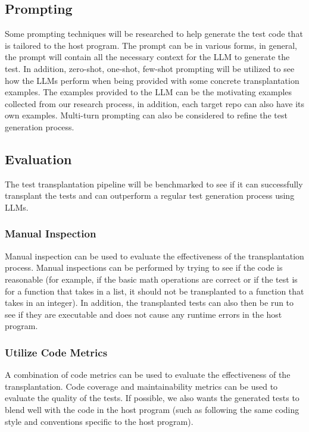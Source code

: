 \documentclass[sigconf]{acmart}
\begin{document}
\subsection{Prompting}
Some prompting techniques will be researched to help generate the test code that is tailored to the host program.
%
The prompt can be in various forms, in general, the prompt will contain all the necessary context for the LLM to generate the test.
%
In addition, zero-shot, one-shot, few-shot prompting will be utilized to see how the LLMs perform when being provided with some concrete transplantation examples.
%
The examples provided to the LLM can be the motivating examples collected from our research process, in addition, each target repo can also have its own examples.
%
Multi-turn prompting can also be considered to refine the test generation process.
%


\subsection{Evaluation}
The test transplantation pipeline will be benchmarked to see if it can successfully transplant the tests and can outperform a regular test generation process using LLMs.

\subsubsection{Manual Inspection}\label{sec:manual-inspection}
Manual inspection can be used to evaluate the effectiveness of the transplantation process. 
%
Manual inspections can be performed by trying to see if the code is reasonable (for example, if the basic math operations are correct or if the test is for a function that takes in a list, it should not be transplanted to a function that takes in an integer).
%
In addition, the transplanted tests can also then be run to see if they are executable and does not cause any runtime errors in the host program.

\subsubsection{Utilize Code Metrics}\label{sec:utilize-code-metrics}
A combination of code metrics can be used to evaluate the effectiveness of the transplantation.
%
Code coverage and maintainability metrics can be used to evaluate the quality of the tests.
%
If possible, we also wants the generated tests to blend well with the code in the host program (such as following the same coding style and conventions specific to the host program).
\end{document}
